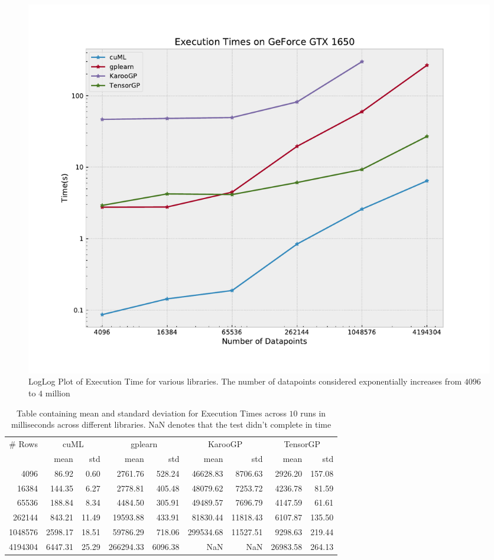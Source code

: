 \begin{figure}[htbp]
  \centering
  \includegraphics[scale=0.55]{images/ExecutionTimes.pdf}
  \caption{LogLog Plot of Execution Time for various libraries. The number of datapoints considered exponentially increases from $4096$ to $4$ million}
  \label{fig:exectimes}
\end{figure}

\begin{table}[htbp]
  \caption{Table containing mean and standard deviation for Execution Times across $10$ runs in milliseconds across different libraries. NaN denotes that the test didn't complete in time}
  \begin{adjustbox}{width=\columnwidth,center}
    \begin{tabular}{r|rrrrrrrr}
      \toprule
      \# Rows & \multicolumn{2}{c}{cuML} & \multicolumn{2}{c}{gplearn} & \multicolumn{2}{c}{KarooGP} & \multicolumn{2}{c}{TensorGP} \\
              &    mean &   std &      mean &     std &      mean &      std &     mean &    std \\
      \midrule
         4096 &   86.92 &  0.60 &   2761.76 &  528.24 &  46628.83 &  8706.63 &  2926.20 & 157.08 \\
        16384 &  144.35 &  6.27 &   2778.81 &  405.48 &  48079.62 &  7253.72 &  4236.78 &  81.59 \\
        65536 &  188.84 &  8.34 &   4484.50 &  305.91 &  49489.57 &  7696.79 &  4147.59 &  61.61 \\
       262144 &  843.21 & 11.49 &  19593.88 &  433.91 &  81830.44 & 11818.43 &  6107.87 & 135.50 \\
      1048576 & 2598.17 & 18.51 &  59786.29 &  718.06 & 299534.68 & 11527.51 &  9298.63 & 219.44 \\
      4194304 & 6447.31 & 25.29 & 266294.33 & 6096.38 &       NaN &      NaN & 26983.58 & 264.13 \\
      \bottomrule
      \end{tabular}
    \label{tab:execavgs}
  \end{adjustbox}
\end{table}


